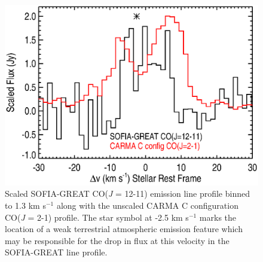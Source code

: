 \documentclass[iop]{emulateapj}
\begin{document}
\begin{figure}[hbt!]
\centering
\includegraphics[trim=60pt 0pt 0pt 0pt, scale=0.65]{f19.eps}
\caption{Scaled SOFIA-GREAT CO(\textit{J} = 12-11) emission line profile binned to 1.3 km s${}^{-1}$ along with the unscaled CARMA C configuration CO(\textit{J} = 2-1) profile. The star symbol at -2.5 km s${}^{-1}$ marks the location of a weak terrestrial atmospheric emission feature which may be responsible for the drop in flux at this velocity in the SOFIA-GREAT line profile.}
\label{fig:fig8}
\end{figure}
\end{document}
